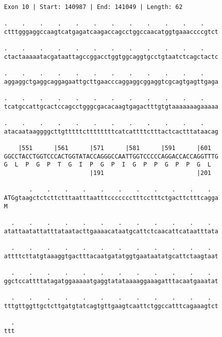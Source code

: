 \documentclass{article}
\begin{document}
\begin{Verbatim}[fontfamily=courier]
Exon 10 | Start: 140987 | End: 141049 | Length: 62

.    .    .    .    .    .    .    .    .    .    .    .    
ctttgggaggccaagtcatgagatcaagaccagcctggccaacatggtgaaaccccgtct

.    .    .    .    .    .    .    .    .    .    .    .    
ctactaaaaatacgataattagccggacctggtggcaggtgcctgtaatctcagctactc

.    .    .    .    .    .    .    .    .    .    .    .    
aggaggctgaggcaggagaattgcttgaacccaggaggcggaggtcgcagtgagttgaga

.    .    .    .    .    .    .    .    .    .    .    .    
tcatgccattgcactccagcctgggcgacacaagtgagactttgtgtaaaaaaagaaaaa

.    .    .    .    .    .    .    .    .    .    .    .    
atacaataaggggcttgtttttcttttttttcatcattttctttactcactttataacag

    |551      |561      |571      |581      |591      |601  
GGCCTACCTGGTCCCACTGGTATACCAGGGCCAATTGGTCCCCCAGGACCACCAGGTTTG
G  L  P  G  P  T  G  I  P  G  P  I  G  P  P  G  P  P  G  L  
                        |191                          |201  

       .    .    .    .    .    .    .    .    .    .    .  
ATGgtaagctctcttctttaatttaatttccccccctttcctttctgacttctttcagga
M                                                           

  .    .    .    .    .    .    .    .    .    .    .    .  
atattaatattatttataatacttgaaaacataatgcattctcaacattcataatttata

  .    .    .    .    .    .    .    .    .    .    .    .  
attttcttatgtaaaggtgactttacaatgatatggtgaataatatgcattctaagtaat

  .    .    .    .    .    .    .    .    .    .    .    .  
ggctccattttatagatggaaaaatgaggtatataaaaggaaagatttacaatgaaatat

  .    .    .    .    .    .    .    .    .    .    .    .  
tttgttggttgctcttgatgtatcagtgttgaagtcaattctggccatttcagaaagtct

  .
ttt
\end{Verbatim}
\newpage
\end{document}
